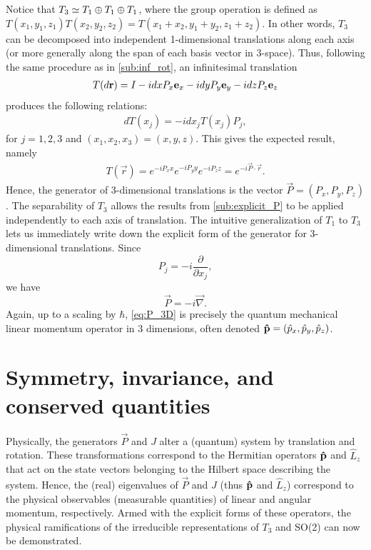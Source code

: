 \sloppy Notice that $T_3\simeq T_1 \oplus T_1 \oplus T_1$, where the group operation is defined as $T(x_1,y_1,z_1)T(x_2,y_2,z_2) = T(x_1+x_2,y_1+y_2,z_1+z_2)$. In other words, $T_3$ can be decomposed into independent 1-dimensional translations along each axis (or more generally along the span of each basis vector in 3-space). Thus, following the same procedure as in \cref{sub:inf_rot}, an infinitesimal translation
\begin{align}
    T(d\mathbf{r}) = I - i dx P_x\mathbf{e}_x - idy P_y\mathbf{e}_y - idz P_z\mathbf{e}_z
\end{align}
produces the following relations:
\begin{align}
    dT(x_j) = -idx_j T(x_j)P_j,
\end{align}
for $j=1,2,3$ and $(x_1,x_2,x_3) = (x,y,z)$.
This gives the expected result, namely
\begin{align}
    T(\vec{r}) = e^{-iP_x x}e^{-iP_y y}e^{-iP_z z} = e^{-i\vec{P}\cdot\vec{r}}.
\end{align}
Hence, the generator of 3-dimensional translations is the vector $\vec{P}=(P_x,P_y,P_z)$. The separability of $T_3$ allows the results from \cref{sub:explicit_P} to be applied independently to each axis of translation. The intuitive generalization of $T_1$ to $T_3$ lets us immediately write down the explicit form of the generator for 3-dimensional translations. Since
\begin{equation}
    P_j = -i\frac{\partial}{\partial x_j},
\end{equation}
we have
\begin{equation}
    \vec{P} = -i\vec{\nabla}.\label{eq:P_3D}
\end{equation}
Again, up to a scaling by $\hbar$, \cref{eq:P_3D} is precisely the quantum mechanical linear momentum operator in 3 dimensions, often denoted $\mathbf{\hat{p}}=(\hat{p}_x,\hat{p}_y,\hat{p}_z)$.


\section{Symmetry, invariance, and conserved quantities}\label{sec:PJ_physical}

Physically, the generators $\vec{P}$ and $J$ alter a (quantum) system by translation and rotation. These transformations correspond to the Hermitian operators $\mathbf{\hat{p}}$ and $\hat{L}_z$ that act on the state vectors belonging to the Hilbert space describing the system. Hence, the (real) eigenvalues of $\vec{P}$ and $J$ (thus $\mathbf{\hat{p}}$ and $\hat{L}_z$) correspond to the physical observables (measurable quantities) of linear and angular momentum, respectively. Armed with the explicit forms of these operators, the physical ramifications of the irreducible representations of $T_3$ and SO(2) can now be demonstrated.

